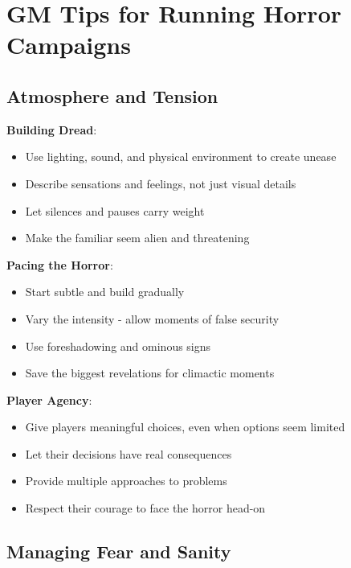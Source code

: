 \documentclass[11pt]{article}
\begin{document}
\section*{GM Tips for Running Horror Campaigns}

\subsection*{Atmosphere and Tension}

\begin{mdframed}[backgroundcolor=horrorbg]
\textbf{Building Dread}:
\begin{itemize}[leftmargin=*]
\item Use lighting, sound, and physical environment to create unease
\item Describe sensations and feelings, not just visual details
\item Let silences and pauses carry weight
\item Make the familiar seem alien and threatening
\end{itemize}

\textbf{Pacing the Horror}:
\begin{itemize}[leftmargin=*]
\item Start subtle and build gradually
\item Vary the intensity - allow moments of false security
\item Use foreshadowing and ominous signs
\item Save the biggest revelations for climactic moments
\end{itemize}

\textbf{Player Agency}:
\begin{itemize}[leftmargin=*]
\item Give players meaningful choices, even when options seem limited
\item Let their decisions have real consequences
\item Provide multiple approaches to problems
\item Respect their courage to face the horror head-on
\end{itemize}
\end{mdframed}

\subsection*{Managing Fear and Sanity}
\end{document}
